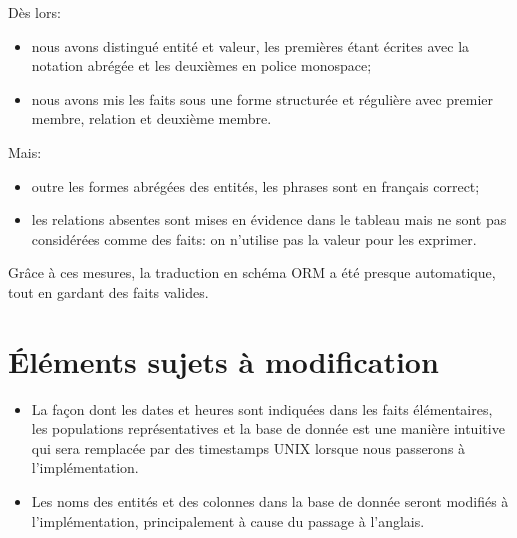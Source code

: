 \documentclass[a4paper,10pt]{article}
\begin{document}
Dès lors:
\begin{itemize}
    \item nous avons distingué entité et valeur, les premières étant écrites avec la notation abrégée et les deuxièmes en police monospace;
    \item nous avons mis les faits sous une forme structurée et régulière avec premier membre, relation et deuxième membre.
\end{itemize}

Mais:
\begin{itemize}
    \item outre les formes abrégées des entités, les phrases sont en français correct;
    \item les relations absentes sont mises en évidence dans le tableau mais ne sont pas considérées comme des faits: on n'utilise pas la valeur  pour les exprimer.
\end{itemize}

Grâce à ces mesures, la traduction en schéma ORM a été presque automatique, tout en gardant des faits valides.

\section{Éléments sujets à modification}

\begin{itemize}
    \item La façon dont les dates et heures sont indiquées dans les faits élémentaires, les populations représentatives et la base de donnée est une manière intuitive qui sera remplacée par des timestamps UNIX lorsque nous passerons à l'implémentation.
    \item Les noms des entités et des colonnes dans la base de donnée seront modifiés à l'implémentation, principalement à cause du passage à l'anglais.
\end{itemize}
\end{document}
